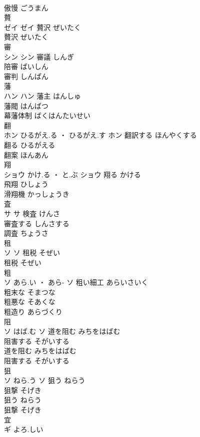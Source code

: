 \documentclass[8pt]{extreport}
\begin{document}
\begin{CJK}{UTF8}{min}
\\	傲慢	ごうまん	
\\	贅	
\\	ゼイ		ゼイ	贅沢	ぜいたく	
\\	贅沢	ぜいたく	
\\	審	
\\	シン		シン	審議	しんぎ	
\\	陪審	ばいしん	
\\	審判	しんぱん	
\\	藩	
\\	ハン		ハン	藩主	はんしゅ	
\\	藩閥	はんばつ	
\\	幕藩体制	ばくはんたいせい	
\\	翻	
\\	ホン	ひるがえ.る ・ ひるがえ.す	ホン	翻訳する	ほんやくする	
\\	翻る	ひるがえる	
\\	翻案	ほんあん	
\\	翔	
\\	ショウ	かけ.る ・ と.ぶ	ショウ	翔る	かける	
\\	飛翔	ひしょう	
\\	滑翔機	かっしょうき	
\\	査	
\\	サ		サ	検査	けんさ	
\\	審査する	しんさする	
\\	調査	ちょうさ	
\\	租	
\\	ソ		ソ	租税	そぜい	
\\	租税	そぜい	
\\	粗	
\\	ソ	あら.い ・ あら-	ソ	粗い細工	あらいさいく	
\\	粗末な	そまつな	
\\	粗悪な	そあくな	
\\	粗造り	あらづくり	
\\	阻	
\\	ソ	はば.む	ソ	道を阻む	みちをはばむ	
\\	阻害する	そがいする	
\\	道を阻む	みちをはばむ	
\\	阻害する	そがいする	
\\	狙	
\\	ソ	ねら.う	ソ	狙う	ねらう	
\\	狙撃	そげき	
\\	狙う	ねらう	
\\	狙撃	そげき	
\\	宜	
\\	ギ	よろ.しい

\end{CJK}
\end{document}
